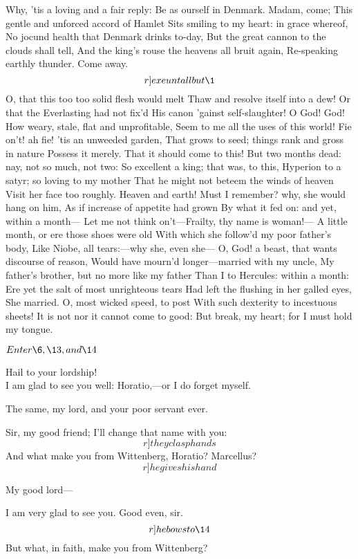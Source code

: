 \documentclass[11pt]{book}
\begin{document}
\2	Why, 'tis a loving and a fair reply:
	Be as ourself in Denmark. Madam, come;
	This gentle and unforced accord of Hamlet
	Sits smiling to my heart: in grace whereof,
	No jocund health that Denmark drinks to-day,
	But the great cannon to the clouds shall tell,
	And the king's rouse the heavens all bruit again,
	Re-speaking earthly thunder. Come away. 	\[r]exeunt all but \1\]
\1	O, that this too too solid flesh would melt
	Thaw and resolve itself into a dew!
	Or that the Everlasting had not fix'd
	His canon 'gainst self-slaughter! O God! God!
	How weary, stale, flat and unprofitable,
	Seem to me all the uses of this world!
	Fie on't! ah fie! 'tis an unweeded garden,
	That grows to seed; things rank and gross in nature
	Possess it merely. That it should come to this!
	But two months dead: nay, not so much, not two:
	So excellent a king; that was, to this,
	Hyperion to a satyr; so loving to my mother
	That he might not beteem the winds of heaven
	Visit her face too roughly. Heaven and earth!
	Must I remember? why, she would hang on him,
	As if increase of appetite had grown
	By what it fed on: and yet, within a month---
	Let me not think on't---Frailty, thy name is woman!---
	A little month, or ere those shoes were old
	With which she follow'd my poor father's body,
	Like Niobe, all tears:---why she, even she---
	O, God! a beast, that wants discourse of reason,
	Would have mourn'd longer---married with my uncle,
	My father's brother, but no more like my father
	Than I to Hercules: within a month:
	Ere yet the salt of most unrighteous tears
	Had left the flushing in her galled eyes,
	She married. O, most wicked speed, to post
	With such dexterity to incestuous sheets!
	It is not nor it cannot come to good:
	But break, my heart; for I must hold my tongue.

	\(Enter \6, \13, and \14\)

\6	Hail to your lordship! \\

\1	I am glad to see you well:
	Horatio,---or I do forget myself.

\6	The same, my lord, and your poor servant ever.

\1	Sir, my good friend; I'll change that name with you: \[r]they clasp hands\]
	And what make you from Wittenberg, Horatio?
   Marcellus?  \[r]he gives his hand\]

	My good lord---

\1	I am very glad to see you. Good even, sir.    \[r]he bows to \14\]
   But what, in faith, make you from Wittenberg?
\end{document}
